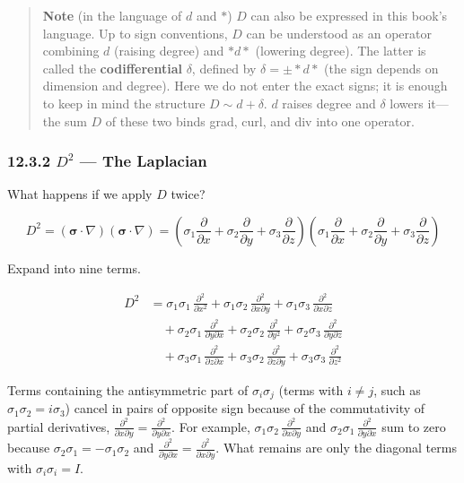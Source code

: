 \begin{quote}
\textbf{Note} (in the language of \(d\) and \(\ast\)) \(D\) can also be
expressed in this book's language. Up to sign conventions, \(D\) can be
understood as an operator combining \(d\) (raising degree) and
\(\ast d\ast\) (lowering degree). The latter is called the
\textbf{codifferential} \(\delta\), defined by
\(\delta = \pm\ast d\ast\) (the sign depends on dimension and degree).
Here we do not enter the exact signs; it is enough to keep in mind the
structure \(D \sim d + \delta\). \(d\) raises degree and \(\delta\)
lowers it---the sum \(D\) of these two binds grad, curl, and div into
one operator.
\end{quote}

\hypertarget{d2-the-laplacian}{%
\subsubsection{\texorpdfstring{12.3.2 \(D^2\) --- The
Laplacian}{12.3.2 D\^{}2 --- The Laplacian}}\label{d2-the-laplacian}}

What happens if we apply \(D\) twice?

\[D^2 = (\bm{\sigma}\!\cdot\!\nabla)(\bm{\sigma}\!\cdot\!\nabla) = (\sigma_1\frac{\partial}{\partial x} + \sigma_2\frac{\partial}{\partial y} + \sigma_3\frac{\partial}{\partial z})(\sigma_1\frac{\partial}{\partial x} + \sigma_2\frac{\partial}{\partial y} + \sigma_3\frac{\partial}{\partial z})\]

Expand into nine terms.

\[
\begin{aligned}
D^2 &= \sigma_1\sigma_1\,\frac{\partial^2}{\partial x^2} + \sigma_1\sigma_2\,\frac{\partial^2}{\partial x\partial y} + \sigma_1\sigma_3\,\frac{\partial^2}{\partial x\partial z} \\
&\quad + \sigma_2\sigma_1\,\frac{\partial^2}{\partial y\partial x} + \sigma_2\sigma_2\,\frac{\partial^2}{\partial y^2} + \sigma_2\sigma_3\,\frac{\partial^2}{\partial y\partial z} \\
&\quad + \sigma_3\sigma_1\,\frac{\partial^2}{\partial z\partial x} + \sigma_3\sigma_2\,\frac{\partial^2}{\partial z\partial y} + \sigma_3\sigma_3\,\frac{\partial^2}{\partial z^2}
\end{aligned}
\]

Terms containing the antisymmetric part of \(\sigma_i\sigma_j\) (terms
with \(i\neq j\), such as \(\sigma_1\sigma_2 = i\sigma_3\)) cancel in
pairs of opposite sign because of the commutativity of partial
derivatives,
\(\frac{\partial^2}{\partial x\partial y} = \frac{\partial^2}{\partial y\partial x}\).
For example,
\(\sigma_1\sigma_2\,\frac{\partial^2}{\partial x\partial y}\) and
\(\sigma_2\sigma_1\,\frac{\partial^2}{\partial y\partial x}\) sum to
zero because \(\sigma_2\sigma_1 = -\sigma_1\sigma_2\) and
\(\frac{\partial^2}{\partial y\partial x} = \frac{\partial^2}{\partial x\partial y}\).
What remains are only the diagonal terms with \(\sigma_i\sigma_i = I\).

